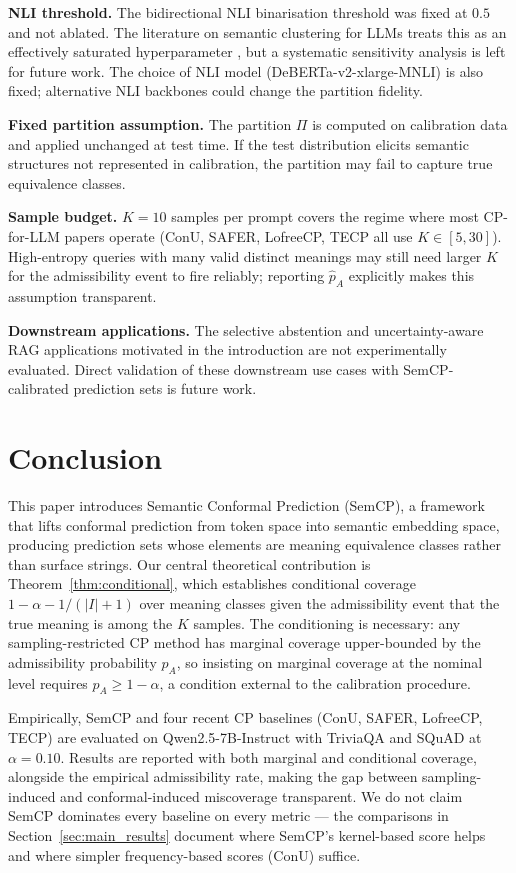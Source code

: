\documentclass{article}
\begin{document}
\textbf{NLI threshold.} The bidirectional NLI binarisation threshold was fixed at $0.5$ and not ablated. The literature on semantic clustering for LLMs treats this as an effectively saturated hyperparameter \citep{kuhn2023semantic}, but a systematic sensitivity analysis is left for future work. The choice of NLI model (DeBERTa-v2-xlarge-MNLI) is also fixed; alternative NLI backbones could change the partition fidelity.

\textbf{Fixed partition assumption.} The partition $\Pi$ is computed on calibration data and applied unchanged at test time. If the test distribution elicits semantic structures not represented in calibration, the partition may fail to capture true equivalence classes.

\textbf{Sample budget.} $K = 10$ samples per prompt covers the regime where most CP-for-LLM papers operate (ConU, SAFER, LofreeCP, TECP all use $K \in [5, 30]$). High-entropy queries with many valid distinct meanings may still need larger $K$ for the admissibility event to fire reliably; reporting $\hat{p}_A$ explicitly makes this assumption transparent.

\textbf{Downstream applications.} The selective abstention and uncertainty-aware RAG applications motivated in the introduction are not experimentally evaluated. Direct validation of these downstream use cases with SemCP-calibrated prediction sets is future work.

\section{Conclusion}

\label{sec:conclusion}

This paper introduces Semantic Conformal Prediction (SemCP), a framework that lifts conformal prediction from token space into semantic embedding space, producing prediction sets whose elements are meaning equivalence classes rather than surface strings. Our central theoretical contribution is Theorem~\ref{thm:conditional}, which establishes conditional coverage $1 - \alpha - 1/(|I|+1)$ over meaning classes given the admissibility event that the true meaning is among the $K$ samples. The conditioning is necessary: any sampling-restricted CP method has marginal coverage upper-bounded by the admissibility probability $p_A$, so insisting on marginal coverage at the nominal level requires $p_A \ge 1 - \alpha$, a condition external to the calibration procedure.

Empirically, SemCP and four recent CP baselines (ConU, SAFER, LofreeCP, TECP) are evaluated on Qwen2.5-7B-Instruct with TriviaQA and SQuAD at $\alpha = 0.10$. Results are reported with both marginal and conditional coverage, alongside the empirical admissibility rate, making the gap between sampling-induced and conformal-induced miscoverage transparent. We do not claim SemCP dominates every baseline on every metric --- the comparisons in Section~\ref{sec:main_results} document where SemCP's kernel-based score helps and where simpler frequency-based scores (ConU) suffice.
\end{document}
